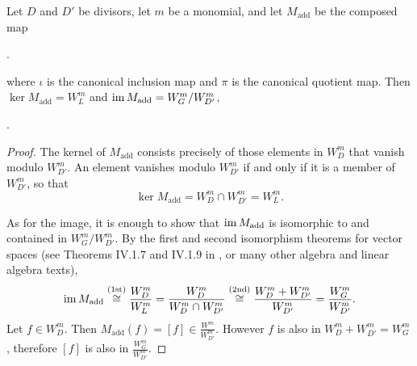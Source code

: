 \begin{theorem}
  Let $D$ and $D'$ be divisors, let $m$ be a monomial, and let $M_{\text{add}}$ be the composed map
  \begin{center}
    .
  \end{center}
  where $\iota$ is the canonical inclusion map and $\pi$ is the canonical quotient map.
  Then $\ker M_{\text{add}} = W_L^m$ and $\operatorname{im} M_{\text{add}} = W_G^m / W_{D'}^m$,
  \begin{center}
    .
  \end{center}
\end{theorem}
\begin{proof}
  The kernel of $M_{\text{add}}$ consists precisely of those elements in $W_D^m$ that vanish modulo $W_{D'}^m$.
  An element vanishes modulo $W_{D'}^m$ if and only if it is a member of $W_{D'}^m$, so that
  \[ \ker M_{\text{add}} = W_D^m \cap W_{D'}^m = W_L^m. \]

  As for the image, it is enough to show that $\operatorname{im} M_{\text{add}}$ is isomorphic to and contained in $W_G^m / W_{D'}^m$.
  By the first and second isomorphism theorems for vector spaces
  (see Theorems IV.1.7 and IV.1.9 in \cite{hungerford}, or many other algebra and linear algebra texts),
  \[ \operatorname{im} M_{\text{add}} \overset{\text{(1st)}}{\cong} \frac {W_D^m} {W_L^m}
           = \frac {W_D^m} {W_D^m \cap W_{D'}^m}
           \overset{\text{(2nd)}}{\cong} \frac {W_D^m + W_{D'}^m} {W_{D'}^m}
           = \frac {W_G^m} {W_{D'}^m}. \]
  Let $f \in W_D^m$.
  Then $M_{\text{add}}(f) = [f] \in \frac {W^m} {W_{D'}^m}$.
  However $f$ is also in $W_D^m + W_{D'}^m = W_G^m$,
  therefore $[f]$ is also in $\frac {W_G^m} {W_{D'}^m}$.
\end{proof}

